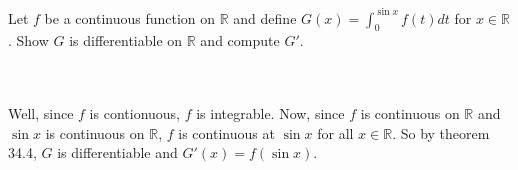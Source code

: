 Let $f$ be a continuous function on $\mathbb{R}$ and define $G(x)=\int_0^{\sin x}f(t)dt$ for
$x\in\mathbb{R}$. Show $G$ is differentiable on $\mathbb{R}$ and compute $G'$.\\\\

\begin{solution}\renewcommand{\qedsymbol}{}\ \\
    Well, since $f$ is contionuous, $f$ is integrable. Now, since $f$ is continuous on $\mathbb{R}$ and
    $\sin x$ is continuous on $\mathbb{R}$, $f$ is continuous at $\sin x$ for all $x\in\mathbb{R}$. So
    by theorem 34.4, $G$ is differentiable and $G'(x)=f(\sin x)$.

\end{solution}